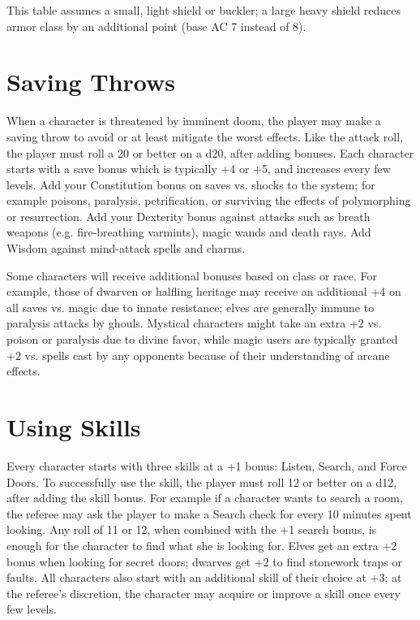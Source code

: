 \documentclass[12pt]{article}
\begin{document}
This table assumes a small, light shield or buckler; a large heavy
shield reduces armor class by an additional point (base AC 7 instead
of 8).

\section{Saving Throws}

When a character is threatened by imminent doom, the player may make a
saving throw to avoid or at least mitigate the worst effects. Like the
attack roll, the player must roll a 20 or better on a d20, after
adding bonuses. Each character starts with a save bonus which is
typically +4 or +5, and increases every few levels. Add your
Constitution bonus on saves vs. shocks to the system; for example
poisons, paralysis, petrification, or surviving the effects of
polymorphing or resurrection. Add your Dexterity bonus against attacks
such as breath weapons (e.g. fire-breathing varmints), magic wands and
death rays. Add Wisdom against mind-attack spells and charms.

Some characters will receive additional bonuses based on class or
race. For example, those of dwarven or halfling heritage may receive
an additional +4 on all saves vs. magic due to innate resistance;
elves are generally immune to paralysis attacks by ghouls. Mystical
characters might take an extra +2 vs. poison or paralysis due to
divine favor, while magic users are typically granted +2 vs. spells
cast by any opponents because of their understanding of arcane
effects.

\section{Using Skills}

Every character starts with three skills at a +1 bonus: Listen,
Search, and Force Doors. To successfully use the skill, the player
must roll 12 or better on a d12, after adding the skill bonus. For
example if a character wants to search a room, the referee may ask the
player to make a Search check for every 10 minutes spent looking.  Any
roll of 11 or 12, when combined with the +1 search bonus, is enough
for the character to find what she is looking for. Elves get an extra
+2 bonus when looking for secret doors; dwarves get +2 to find
stonework traps or faults. All characters also start with an
additional skill of their choice at +3; at the referee's discretion, the
character may acquire or improve a skill once every few levels.
\end{document}
